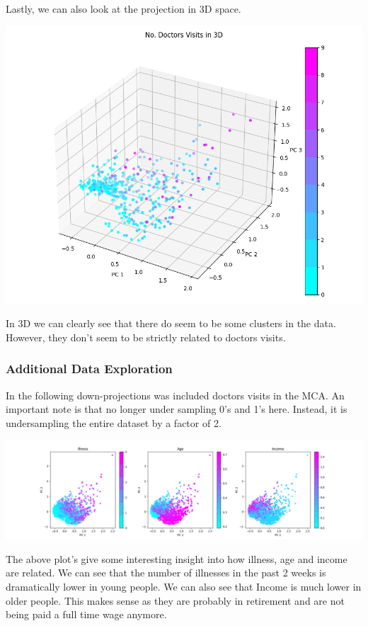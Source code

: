 \documentclass[
]{article}
\begin{document}
Lastly, we can also look at the projection in 3D space.

\includegraphics{mca_doctorco_3d.png}

In 3D we can clearly see that there do seem to be some clusters in the
data. However, they don't seem to be strictly related to doctors visits.

\subsubsection{Additional Data
Exploration}\label{additional-data-exploration}

In the following down-projections was included doctors visits in the
MCA. An important note is that no longer under sampling 0's and 1's
here. Instead, it is undersampling the entire dataset by a factor of 2.

\includegraphics{mca_2d_bunchofstuff.png}

The above plot's give some interesting insight into how illness, age and
income are related. We can see that the number of illnesses in the past
2 weeks is dramatically lower in young people. We can also see that
Income is much lower in older people. This makes sense as they are
probably in retirement and are not being paid a full time wage anymore.
\end{document}

